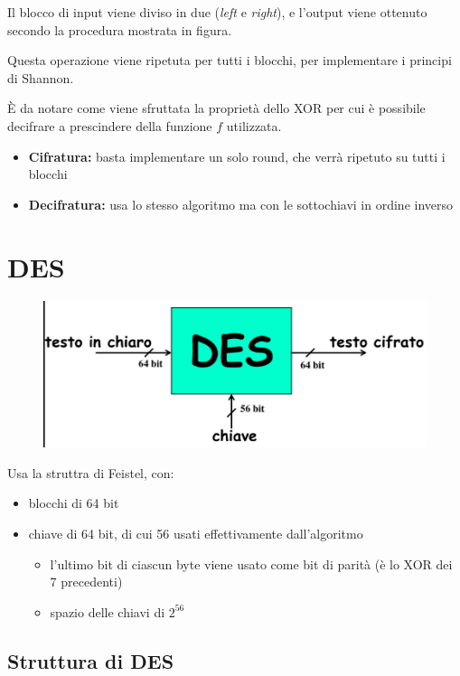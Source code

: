 Il blocco di input viene diviso in due (\textit{left} e \textit{right}), e l'output viene 
ottenuto secondo la procedura mostrata in figura.

\noindent Questa operazione viene ripetuta per tutti i blocchi, per implementare i principi di Shannon.

\noindent È da notare come viene sfruttata la proprietà dello XOR per cui è possibile decifrare 
a prescindere della funzione $f$ utilizzata.

\begin{itemize}
    \item \textbf{Cifratura:} basta implementare un solo round, che verrà ripetuto su tutti i blocchi 
    \item \textbf{Decifratura:} usa lo stesso algoritmo ma con le sottochiavi in ordine inverso 
\end{itemize}

\section{DES}

\begin{figure}[H]
    \centering
    \includegraphics[width=0.8\linewidth]{chapters/chap03/images/des.png}
\end{figure}

Usa la struttra di Feistel, con:
\begin{itemize}
    \item blocchi di 64 bit 
    \item chiave di 64 bit, di cui 56 usati effettivamente dall'algoritmo
    \begin{itemize}
        \item l'ultimo bit di ciascun byte viene usato come bit di parità (è lo XOR dei 7 precedenti)
        \item spazio delle chiavi di $2^{56}$
    \end{itemize}

\end{itemize}

\subsection{Struttura di DES}

